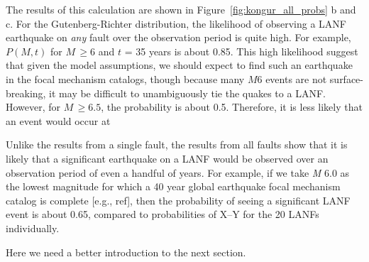 \documentclass[twocolumn,grl]{AGUTeX}
\begin{document}
\begin{article}
The results of this calculation are shown in
Figure~\ref{fig:kongur_all_probs} b and c.
For the Gutenberg-Richter distribution, the likelihood of observing a LANF
earthquake on \emph{any} fault over the observation period is quite high.
For example, $P(M,t)$ for $M \, \ge 6$ and $t$ = 35 years is about 0.85.
This high likelihood suggest that given the model assumptions, we should
expect to find such an earthquake in the focal mechanism catalogs, though
because many $M6$ events are not surface-breaking, it may be difficult to
unambiguously tie the quakes to a LANF.
However, for $M \, \ge 6.5$, the probability is about 0.5.  Therefore, it is
less likely that an event would occur at 


Unlike the results from a single
fault, the results from all faults show that it is likely that a
significant earthquake on a LANF would be observed over an observation
period of even a handful of years.  For example, if we take \emph{M}
6.0 as the lowest magnitude for which a 40 year global earthquake
focal mechanism catalog is complete [e.g., ref], then the probability
of seeing a significant LANF event is about 0.65, compared to
probabilities of X--Y for the 20 LANFs individually.

Here we need a better introduction to the next section.

%




\end{article}
\end{document}
